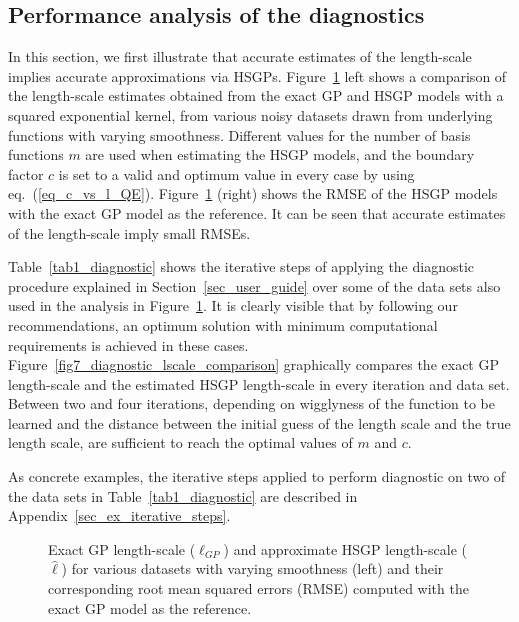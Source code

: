 \subsection{Performance analysis of the diagnostics}

In this section, we first illustrate that accurate estimates of the length-scale implies accurate approximations via HSGPs. Figure~\ref{fig6_lscale_comparison} left shows a comparison of the length-scale estimates
obtained from the exact GP and HSGP models with a squared exponential kernel, from various noisy datasets drawn from underlying functions with varying smoothness. Different values for the number of basis functions $m$ are used when estimating the HSGP models, and the boundary factor $c$ is set to a valid and optimum value in every case by using eq.~(\ref{eq_c_vs_l_QE}). Figure~\ref{fig6_lscale_comparison} (right) shows the RMSE of the HSGP models with the exact GP model as the reference. It can be seen that accurate estimates of the length-scale imply small RMSEs.

Table~\ref{tab1_diagnostic} shows the iterative steps of applying the diagnostic procedure explained in Section~\ref{sec_user_guide} over some of the data sets also used in the analysis in Figure~\ref{fig6_lscale_comparison}. It is clearly visible that by following our recommendations, an optimum solution with minimum computational requirements is achieved in these cases. Figure~\ref{fig7_diagnostic_lscale_comparison} graphically compares the exact GP length-scale and the estimated HSGP length-scale in every iteration and data set. Between two and four iterations, depending on wigglyness of the function to be learned and the distance between the initial guess of the length scale and the true length scale, are sufficient to reach the optimal values of $m$ and $c$. 

As concrete examples, the iterative steps applied to perform diagnostic on two of the data sets in Table~\ref{tab1_diagnostic} are described in Appendix~\ref{sec_ex_iterative_steps}.

\begin{figure}[t]
\centering
{}
\caption{Exact GP length-scale ($\ell_{GP}$) and approximate HSGP length-scale ($\hat{\ell}$) for various datasets with varying smoothness (left) and their corresponding root mean squared errors (RMSE) computed with the exact GP model as the reference.}
  \label{fig6_lscale_comparison}
\end{figure}

